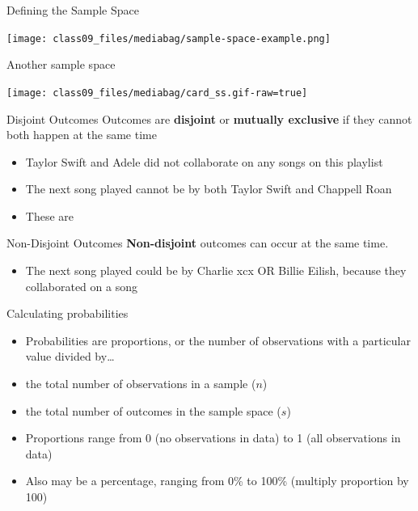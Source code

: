 \documentclass[
  ignorenonframetext,
]{beamer}
\providecommand{\tightlist}{%
  \setlength{\itemsep}{0pt}\setlength{\parskip}{0pt}}\usepackage{longtable,booktabs,array}
\begin{document}
\begin{frame}{Defining the Sample Space}
\label{defining-the-sample-space-1}
\begin{center}
\texttt{[image: class09\_files/mediabag/sample-space-example.png]}
\end{center}
\end{frame}

\begin{frame}{Another sample space}
\label{another-sample-space}
\begin{center}
\texttt{[image: class09\_files/mediabag/card\_ss.gif-raw=true]}
\end{center}
\end{frame}

\begin{frame}{Disjoint Outcomes}
\label{disjoint-outcomes}
Outcomes are \textbf{disjoint} or \textbf{mutually exclusive} if they
cannot both happen at the same time

\begin{itemize}
\item
  Taylor Swift and Adele did not collaborate on any songs on this
  playlist
\item
  The next song played cannot be by both Taylor Swift and Chappell Roan
\item
  These are
\end{itemize}
\end{frame}

\begin{frame}{Non-Disjoint Outcomes}
\label{non-disjoint-outcomes}
\textbf{Non-disjoint} outcomes can occur at the same time.

\begin{itemize}
\tightlist
\item
  The next song played could be by Charlie xcx OR Billie Eilish, because
  they collaborated on a song
\end{itemize}
\end{frame}

\begin{frame}{Calculating probabilities}
\label{calculating-probabilities}
\begin{itemize}
\item
  Probabilities are proportions, or the number of observations with a
  particular value divided by\ldots{}
\item
  the total number of observations in a sample (\(n\))
\item
  the total number of outcomes in the sample space (\(s\))
\item
  Proportions range from 0 (no observations in data) to 1 (all
  observations in data)
\item
  Also may be a percentage, ranging from 0\% to 100\% (multiply
  proportion by 100)
\end{itemize}
\end{frame}
\end{document}
